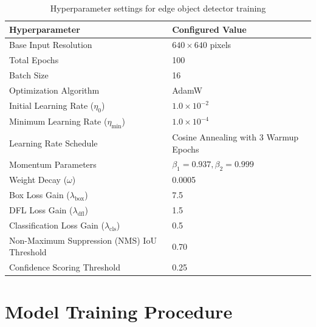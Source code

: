 \begin{table}[htbp]
\centering
\caption{Hyperparameter settings for edge object detector training}
\label{tab:hyperparameters}
\vspace{0.2cm}
\begin{tabular}{|l|l|}
\hline
\textbf{Hyperparameter} & \textbf{Configured Value} \\
\hline
Base Input Resolution & $640 \times 640$ pixels \\
\hline
Total Epochs & 100 \\
\hline
Batch Size & 16 \\
\hline
Optimization Algorithm & AdamW \\
\hline
Initial Learning Rate ($\eta_0$) & $1.0 \times 10^{-2}$ \\
\hline
Minimum Learning Rate ($\eta_{\text{min}}$) & $1.0 \times 10^{-4}$ \\
\hline
Learning Rate Schedule & Cosine Annealing with 3 Warmup Epochs \\
\hline
Momentum Parameters & $\beta_1 = 0.937, \beta_2 = 0.999$ \\
\hline
Weight Decay ($\omega$) & 0.0005 \\
\hline
Box Loss Gain ($\lambda_{\text{box}}$) & 7.5 \\
\hline
DFL Loss Gain ($\lambda_{\text{dfl}}$) & 1.5 \\
\hline
Classification Loss Gain ($\lambda_{\text{cls}}$) & 0.5 \\
\hline
Non-Maximum Suppression (NMS) IoU Threshold & 0.70 \\
\hline
Confidence Scoring Threshold & 0.25 \\
\hline
\end{tabular}
\end{table}

\section{Model Training Procedure}

